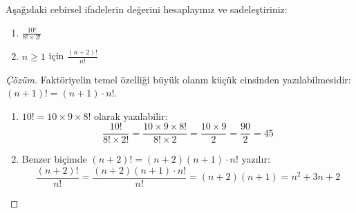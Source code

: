 \begin{example}
Aşağıdaki cebirsel ifadelerin değerini hesaplayınız ve sadeleştiriniz:
\begin{enumerate}
  \item $\frac{10!}{8! \times 2!}$
  \item $n \ge 1$ için $\frac{(n+2)!}{n!}$
\end{enumerate}
\end{example}
\begin{proof}[Çözüm]
Faktöriyelin temel özelliği büyük olanın küçük cinsinden yazılabilmesidir: $(n+1)! = (n+1) \cdot n!$.
\begin{enumerate}
  \item $10! = 10 \times 9 \times 8!$ olarak yazılabilir:
  \[ \frac{10!}{8! \times 2!} = \frac{10 \times 9 \times 8!}{8! \times 2} = \frac{10 \times 9}{2} = \frac{90}{2} = 45 \]
  
  \item Benzer biçimde $(n+2)! = (n+2)(n+1) \cdot n!$ yazılır:
  \[ \frac{(n+2)!}{n!} = \frac{(n+2)(n+1) \cdot n!}{n!} = (n+2)(n+1) = n^2 + 3n + 2 \]
\end{enumerate}
\end{proof}

